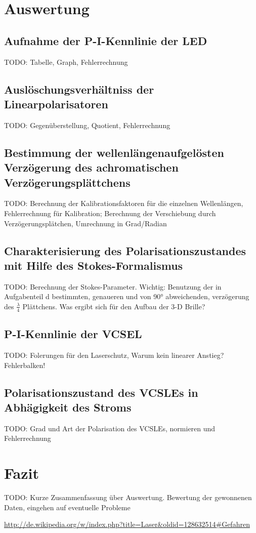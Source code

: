 \documentclass[bigchapter,colorback,accentcolor=tud4b,linedtoc,11pt]{tudreport}
\begin{document}
\chapter{Auswertung}
\section{Aufnahme der P-I-Kennlinie der LED}
TODO: Tabelle, Graph, Fehlerrechnung

\section{Auslöschungsverhältniss der Linearpolarisatoren}
TODO: Gegenüberstellung, Quotient, Fehlerrechnung

\section{Bestimmung der wellenlängenaufgelösten Verzögerung des achromatischen Verzögerungsplättchens}
TODO: Berechnung der Kalibrationsfaktoren für die einzelnen Wellenlängen, Fehlerrechnung für Kalibration; Berechnung der Verschiebung durch Verzögerungsplätchen, Umrechnung in Grad/Radian

\section{Charakterisierung des Polarisationszustandes mit Hilfe des Stokes-Formalismus}
TODO: Berechnung der Stokes-Parameter. Wichtig: Benutzung der in Aufgabenteil d bestimmten, genaueren und von 90° abweichenden, verzögerung des $\frac{\lambda}{4}$ Plättchens. Was ergibt sich für den Aufbau der 3-D Brille?

\section{P-I-Kennlinie der VCSEL}
TODO: Folerungen für den Laserschutz, Warum kein linearer Anstieg? Fehlerbalken!

\section{Polarisationszustand des VCSLEs in Abhägigkeit des Stroms}
TODO: Grad und Art der Polarisation des VCSLEs, normieren und Fehlerrechnung
\chapter{Fazit}
TODO: Kurze Zusammenfassung über Auswertung. Bewertung der gewonnenen Daten, eingehen auf eventuelle Probleme

\cleardoublepage{}
\newpage
\begin{thebibliography}{100}
   \url{http://de.wikipedia.org/w/index.php?title=Laser&oldid=128632514#Gefahren}
\end{thebibliography}

\cleardoublepage{}
\end{document}

